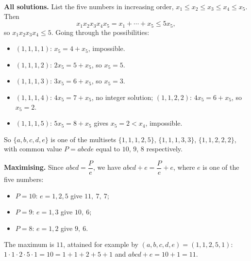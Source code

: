 \textbf{All solutions.} List the five numbers in increasing order, $x_1\le x_2\le x_3\le x_4\le x_5$. Then
\[x_1x_2x_3x_4x_5=x_1+\cdots+x_5\le5x_5,\]
so $x_1x_2x_3x_4\le5$. Going through the possibilities:
\begin{itemize}
\item $(1,1,1,1)$: $x_5=4+x_5$, impossible.
\item $(1,1,1,2)$: $2x_5=5+x_5$, so $x_5=5$.
\item $(1,1,1,3)$: $3x_5=6+x_5$, so $x_5=3$.
\item $(1,1,1,4)$: $4x_5=7+x_5$, no integer solution; $(1,1,2,2)$: $4x_5=6+x_5$, so $x_5=2$.
\item $(1,1,1,5)$: $5x_5=8+x_5$ gives $x_5=2<x_4$, impossible.
\end{itemize}
So $\{a,b,c,d,e\}$ is one of the multisets $\{1,1,1,2,5\}$, $\{1,1,1,3,3\}$, $\{1,1,2,2,2\}$, with common value $P=abcde$ equal to $10$, $9$, $8$ respectively.

\textbf{Maximising.} Since $abcd=\dfrac Pe$, we have $abcd+e=\dfrac Pe+e$, where $e$ is one of the five numbers:
\begin{itemize}
\item $P=10$: $e=1,2,5$ give $11,\ 7,\ 7$;
\item $P=9$: $e=1,3$ give $10,\ 6$;
\item $P=8$: $e=1,2$ give $9,\ 6$.
\end{itemize}
The maximum is $\boxed{11}$, attained for example by $(a,b,c,d,e)=(1,1,2,5,1)$: $1\cdot1\cdot2\cdot5\cdot1=10=1+1+2+5+1$ and $abcd+e=10+1=11$.
